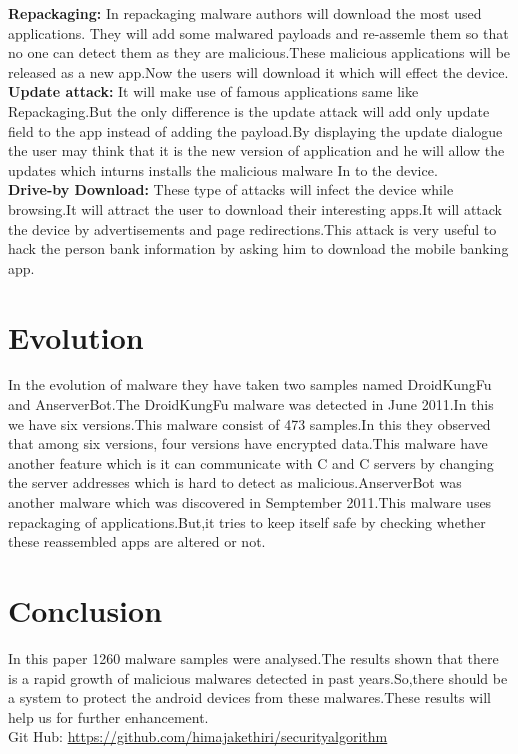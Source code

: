\documentclass{article}
\begin{document}
\textbf{Repackaging:}
      In repackaging malware authors will download the most used applications. They will add some malwared payloads and re-assemle them so that no one can detect them as they are malicious.These malicious applications will be released as a new app.Now the users will download it which will effect the device. \\
      
\textbf{Update attack:}
      It will make use of famous applications same like Repackaging.But the only difference is the update attack will add only update field to the app instead of adding the payload.By displaying the update dialogue the user may think that it is the new version of application and he will allow the updates which inturns installs the malicious malware In to the device.\\
      
\textbf{Drive-by Download:}
     These type of attacks will infect the device while browsing.It will attract the user to download their interesting apps.It will attack the device by advertisements and page redirections.This attack is very useful  to hack the person bank information by asking him to download the mobile banking app.



\section{Evolution} 
      In the evolution of malware they have taken two samples named DroidKungFu and AnserverBot.The DroidKungFu malware was detected in June 2011.In this we have six versions.This malware consist of 473 samples.In this they observed that among six versions, four versions have encrypted data.This malware have another feature which is it can communicate with C and C servers by changing the server addresses which is hard to detect as malicious.AnserverBot was another malware which was discovered in Semptember 2011.This malware uses repackaging of applications.But,it tries to keep itself safe by checking whether these reassembled apps are altered or not.
\section{Conclusion}
     In this paper 1260 malware samples were analysed.The results shown that there is a rapid growth of malicious malwares detected in past years.So,there should be a system to protect the android devices from these malwares.These results will help us for further enhancement.\\

Git Hub: \url{https://github.com/himajakethiri/securityalgorithm}
\end{document}
